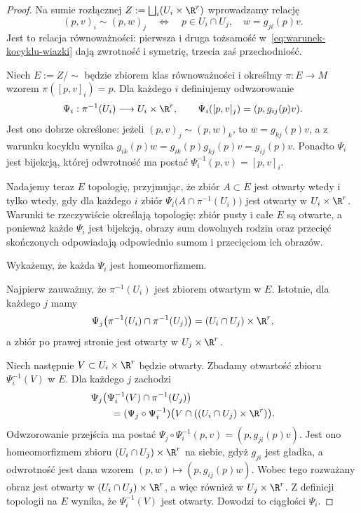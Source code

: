 \begin{proof}
Na sumie rozłącznej $Z:=\bigsqcup_i(U_i\times\R^r)$ wprowadzamy relację
\[
(p,v)_i\sim(p,w)_j
\quad\Longleftrightarrow\quad
p\in U_i\cap U_j,\quad w=g_{ji}(p)v.
\]
Jest to relacja równoważności: pierwsza i druga tożsamość
w~\eqref{eq:warunek-kocyklu-wiazki}
dają zwrotność i symetrię, trzecia zaś przechodniość.

Niech $E:=Z/\sim$ będzie zbiorem klas równoważności i określmy
$\pi:E\to M$ wzorem $\pi([p,v]_i)=p$.
Dla każdego $i$ definiujemy odwzorowanie
\[
\Psi_i:\pi^{-1}(U_i)\longrightarrow U_i\times\R^r,
\qquad
\Psi_i([p,v]_j)=(p,g_{ij}(p)v).
\]
Jest ono dobrze określone: jeżeli $(p,v)_j\sim(p,w)_k$, to
$w=g_{kj}(p)v$, a z warunku kocyklu wynika $g_{ik}(p)w =g_{ik}(p)g_{kj}(p)v =g_{ij}(p)v$.
Ponadto $\Psi_i$ jest bijekcją, której odwrotność ma postać $\Psi_i^{-1}(p,v)=[p,v]_i$.

Nadajemy teraz $E$ topologię, przyjmując, że zbiór $A\subset E$
jest otwarty wtedy i tylko wtedy, gdy dla każdego $i$ zbiór $\Psi_i\bigl(A\cap\pi^{-1}(U_i)\bigr)$
jest otwarty w $U_i\times\R^r$.
Warunki te rzeczywiście określają topologię: zbiór pusty i całe $E$
są otwarte, a ponieważ każde $\Psi_i$ jest bijekcją,
obrazy sum dowolnych rodzin oraz przecięć skończonych
odpowiadają odpowiednio sumom i przecięciom ich obrazów.

Wykażemy, że każda $\Psi_i$ jest homeomorfizmem.

Najpierw zauważmy, że $\pi^{-1}(U_i)$ jest zbiorem otwartym
w $E$. Istotnie, dla każdego $j$ mamy
\[
\Psi_j\bigl(
\pi^{-1}(U_i)\cap\pi^{-1}(U_j)
\bigr)
=(U_i\cap U_j)\times\R^r,
\]
a zbiór po prawej stronie jest otwarty w $U_j\times\R^r$.

Niech następnie $V\subset U_i\times\R^r$ będzie otwarty.
Zbadamy otwartość zbioru $\Psi_i^{-1}(V)$ w $E$.
Dla każdego $j$ zachodzi
\[
\begin{aligned}
&\Psi_j\bigl(
\Psi_i^{-1}(V)\cap\pi^{-1}(U_j)
\bigr)\\
&\qquad =
(\Psi_j\circ\Psi_i^{-1})
\bigl(V\cap((U_i\cap U_j)\times\R^r)\bigr).
\end{aligned}
\]
Odwzorowanie przejścia ma postać $\Psi_j\circ\Psi_i^{-1}(p,v) =(p,g_{ji}(p)v)$.
Jest ono homeomorfizmem zbioru
$(U_i\cap U_j)\times\R^r$ na siebie, gdyż $g_{ji}$
jest gładka, a odwrotność jest dana wzorem $(p,w)\longmapsto(p,g_{ij}(p)w)$.
Wobec tego rozważany obraz jest otwarty w
$(U_i\cap U_j)\times\R^r$, a więc również
w $U_j\times\R^r$. Z definicji topologii na $E$
wynika, że $\Psi_i^{-1}(V)$ jest otwarty.
Dowodzi to ciągłości $\Psi_i$.


\end{proof}
